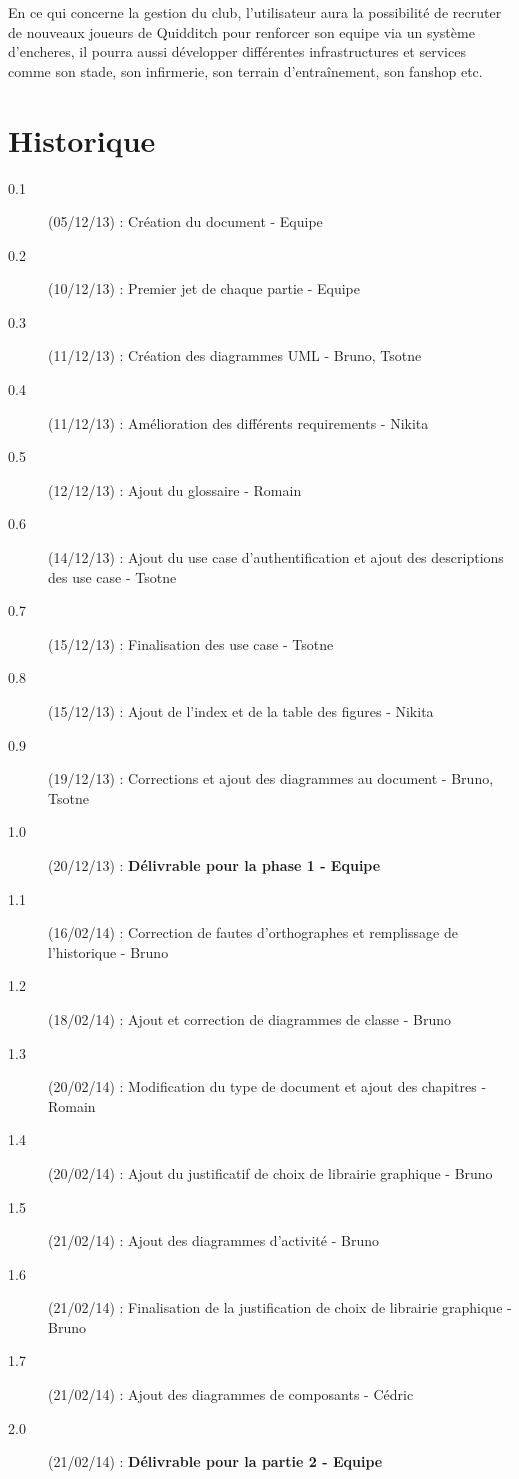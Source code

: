 \documentclass[a4paper]{report}
\begin{document}
En ce qui concerne la gestion du \gls{club}, l'\gls{utilisateur} aura la possibilité de recruter de nouveaux \glspl{joueur} de Quidditch pour renforcer son \gls{equipe} via un système d'\glspl{enchere}, il pourra aussi développer différentes infrastructures et services comme son stade, son infirmerie, son terrain d'entraînement, son fanshop etc.


\printglossary[numberedsection]
\section{Historique}
\begin{description}
    \item[0.1] (05/12/13) : Création du document - Equipe
    \item[0.2] (10/12/13) : Premier jet de chaque partie - Equipe
    \item[0.3] (11/12/13) : Création des diagrammes UML - Bruno, Tsotne
    \item[0.4] (11/12/13) : Amélioration des différents requirements - Nikita
    \item[0.5] (12/12/13) : Ajout du glossaire - Romain
    \item[0.6] (14/12/13) : Ajout du use case d'authentification et ajout des descriptions des use case - Tsotne
    \item[0.7] (15/12/13) : Finalisation des use case - Tsotne
    \item[0.8] (15/12/13) : Ajout de l'index et de la table des figures - Nikita
    \item[0.9] (19/12/13) : Corrections et ajout des diagrammes au document - Bruno, Tsotne
    \item[1.0] (20/12/13) : \textbf{Délivrable pour la phase 1 - Equipe}

    \item[1.1] (16/02/14) : Correction de fautes d'orthographes et remplissage de l'historique - Bruno
    \item[1.2] (18/02/14) : Ajout et correction de diagrammes de classe - Bruno
    \item[1.3] (20/02/14) : Modification du type de document et ajout des chapitres - Romain
    \item[1.4] (20/02/14) : Ajout du justificatif de choix de librairie graphique - Bruno
    \item[1.5] (21/02/14) : Ajout des diagrammes d'activité - Bruno
    \item[1.6] (21/02/14) : Finalisation de la justification de choix de librairie graphique - Bruno
    \item[1.7] (21/02/14) : Ajout des diagrammes de composants - Cédric
    \item[2.0] (21/02/14) : \textbf{Délivrable pour la partie 2 - Equipe}


\end{description}
\end{document}
